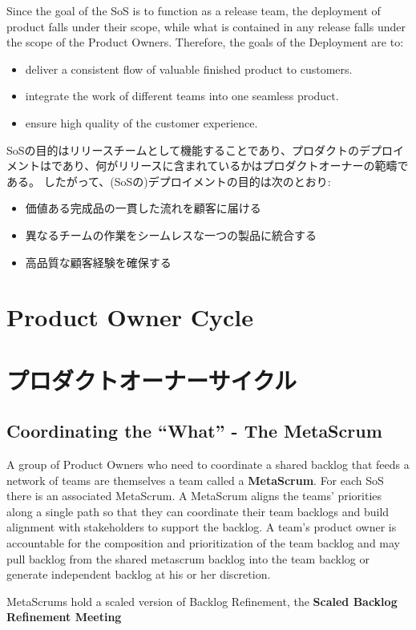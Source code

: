 \documentclass[12pt,a4paper,parskip=full]{scrartcl}
\begin{document}
Since the goal of the SoS is to function as a release team, the deployment
of product falls under their scope, while what is contained in any release
falls under the scope of the Product Owners. Therefore, the goals of the
Deployment are to:
\begin{itemize}
\item deliver a consistent flow of valuable finished product to customers.
\item integrate the work of different teams into one seamless product.
\item ensure high quality of the customer experience.
\end{itemize}
\fi
SoSの目的はリリースチームとして機能することであり、プロダクトのデプロイメントはであり、何がリリースに含まれているかはプロダクトオーナーの範疇である。
したがって、(SoSの)デプロイメントの目的は次のとおり:
\begin{itemize}
\item 価値ある完成品の一貫した流れを顧客に届ける
\item 異なるチームの作業をシームレスな一つの製品に統合する
\item 高品質な顧客経験を確保する
\end{itemize}

\section{Product Owner Cycle}
\fi
\section{プロダクトオーナーサイクル}
\subsection{Coordinating the ``What'' - The MetaScrum}
A group of Product Owners who need to coordinate a shared backlog that
feeds a network of teams are themselves a team called a \textbf{MetaScrum}.
For each SoS there is an associated MetaScrum. A MetaScrum aligns the
teams' priorities along a single path so that they can coordinate their
team backlogs and build alignment with stakeholders to support the backlog.
A team's product owner is accountable for the composition and prioritization
of the team backlog and may pull backlog from the shared metascrum backlog
into the team backlog or generate independent backlog at his or her discretion.

MetaScrums hold a scaled version of Backlog Refinement, the \textbf{Scaled Backlog Refinement Meeting} 
\fi
\end{document}
